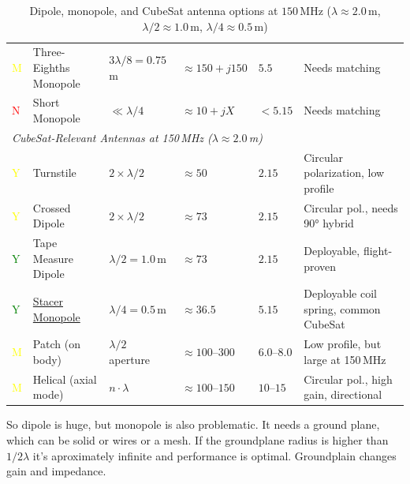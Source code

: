 \begin{table}[H]
\begin{tabular}{llllll}
		\textcolor{yellow}{M}  & Three-Eighths Monopole & $3\lambda/8 = 0.75\,$m   & $\approx 150 + j150$          & $5.5$               & Needs matching                         \\
		\textcolor{red}{N}  & Short Monopole         & $\ll \lambda/4$          & $\approx 10 + jX$             & $< 5.15$            & Needs matching                         \\
		\midrule
		\multicolumn{6}{l}{\textit{CubeSat-Relevant Antennas at 150\,MHz ($\lambda \approx 2.0\,$m)}}                                                    \\
		\midrule
		\textcolor{yellow}{Y}  & Turnstile              & $2\times\lambda/2$       & $\approx 50$                  & $2.15$              & Circular polarization, low profile     \\
		\textcolor{yellow}{Y}  & Crossed Dipole         & $2\times\lambda/2$       & $\approx 73$                  & $2.15$              & Circular pol., needs 90° hybrid        \\
		\textcolor{green}{Y}  & Tape Measure Dipole    & $\lambda/2 = 1.0\,$m     & $\approx 73$                  & $2.15$              & Deployable, flight-proven              \\
		\textcolor{green}{Y}  & \href{https://www.youtube.com/watch?v=bElqBRvqTdo}{Stacer Monopole}       & $\lambda/4 = 0.5\,$m     & $\approx 36.5$                & $5.15$              & Deployable coil spring, common CubeSat \\
		\textcolor{yellow}{M}  & Patch (on body)        & $\lambda/2$ aperture     & $\approx 100$--$300$          & $6.0$--$8.0$        & Low profile, but large at 150\,MHz     \\
		\textcolor{yellow}{M}  & Helical (axial mode)   & $n \cdot \lambda$        & $\approx 100$--$150$          & $10$--$15$          & Circular pol., high gain, directional  \\
		\bottomrule
	\end{tabular}
	\caption{Dipole, monopole, and CubeSat antenna options at $150\,\text{MHz}$ ($\lambda \approx 2.0\,\text{m}$, $\lambda/2 \approx 1.0\,\text{m}$, $\lambda/4 \approx 0.5\,\text{m}$)}
	\label{tab:antenna_150MHz}
\end{table}
So dipole is huge,
but monopole is also problematic.
It needs a ground plane, which can be solid or wires or a mesh.
If the groundplane radius is higher than $1/2 \lambda$ it's aproximately infinite 
and performance is optimal.
Groundplain changes gain and impedance.


